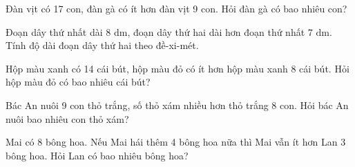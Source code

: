\begin{ex} %
Đàn vịt có 17 con, đàn gà có ít hơn đàn vịt 9 con. Hỏi đàn gà có bao nhiêu con?
\end{ex}

\begin{ex} %
Đoạn dây thứ nhất dài $8\text{ dm}$, đoạn dây thứ hai dài hơn đoạn thứ nhất $7\text{ dm}$. Tính độ dài đoạn dây thứ hai theo đề-xi-mét.
\end{ex}

\begin{ex} %
Hộp màu xanh có 14 cái bút, hộp màu đỏ có ít hơn hộp màu xanh 8 cái bút. Hỏi hộp màu đỏ có bao nhiêu cái bút?
\end{ex}

\begin{ex} %
Bác An nuôi 9 con thỏ trắng, số thỏ xám nhiều hơn thỏ trắng 8 con. Hỏi bác An nuôi bao nhiêu con thỏ xám?
\end{ex}

\begin{ex} %
Mai có 8 bông hoa. Nếu Mai hái thêm 4 bông hoa nữa thì Mai vẫn ít hơn Lan 3 bông hoa. Hỏi Lan có bao nhiêu bông hoa?
\end{ex}
